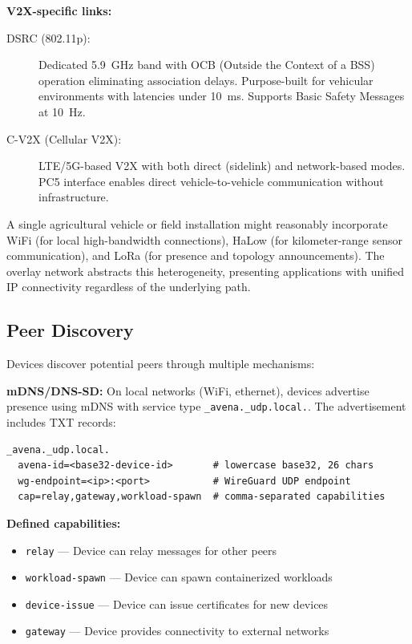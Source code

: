 \textbf{V2X-specific links:}

\begin{description}
    \item[DSRC (802.11p):] Dedicated 5.9~GHz band with OCB (Outside the Context of a BSS) operation eliminating association delays. Purpose-built for vehicular environments with latencies under 10~ms. Supports Basic Safety Messages at 10~Hz.

    \item[C-V2X (Cellular V2X):] LTE/5G-based V2X with both direct (sidelink) and network-based modes. PC5 interface enables direct vehicle-to-vehicle communication without infrastructure.
\end{description}

A single agricultural vehicle or field installation might reasonably incorporate WiFi (for local high-bandwidth connections), HaLow (for kilometer-range sensor communication), and LoRa (for presence and topology announcements). The overlay network abstracts this heterogeneity, presenting applications with unified IP connectivity regardless of the underlying path.

\subsection{Peer Discovery}

Devices discover potential peers through multiple mechanisms:

\textbf{mDNS/DNS-SD:} On local networks (WiFi, ethernet), devices advertise presence using mDNS with service type \texttt{\_avena.\_udp.local.}. The advertisement includes TXT records:

\begin{lstlisting}
_avena._udp.local.
  avena-id=<base32-device-id>       # lowercase base32, 26 chars
  wg-endpoint=<ip>:<port>           # WireGuard UDP endpoint
  cap=relay,gateway,workload-spawn  # comma-separated capabilities
\end{lstlisting}

\textbf{Defined capabilities:}
\begin{itemize}[nosep]
    \item \texttt{relay} --- Device can relay messages for other peers
    \item \texttt{workload-spawn} --- Device can spawn containerized workloads
    \item \texttt{device-issue} --- Device can issue certificates for new devices
    \item \texttt{gateway} --- Device provides connectivity to external networks
\end{itemize}

